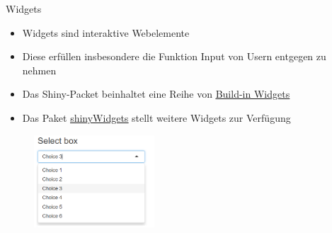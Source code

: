 \documentclass[xcolor=dvipsnames]{beamer}\usepackage[]{graphicx}\usepackage[]{color}
\begin{document}
\begin{frame}{Widgets}
    \begin{itemize}
      \item Widgets sind interaktive Webelemente
      \item Diese erfüllen insbesondere die Funktion Input von Usern entgegen zu nehmen
      \item Das Shiny-Packet beinhaltet eine Reihe von \href{https://shiny.rstudio.com/gallery/widget-gallery.html}{\underline{Build-in Widgets}}
      \item Das Paket \href{http://shinyapps.dreamrs.fr/shinyWidgets/}{\underline{shinyWidgets}} stellt weitere Widgets zur Verfügung
    \end{itemize}
    
  \begin{figure}
  	\centering
  	\includegraphics[width=0.4\textwidth]{figure/SelectBox-Widget.png}
  \end{figure}

\end{frame}
\end{document}
